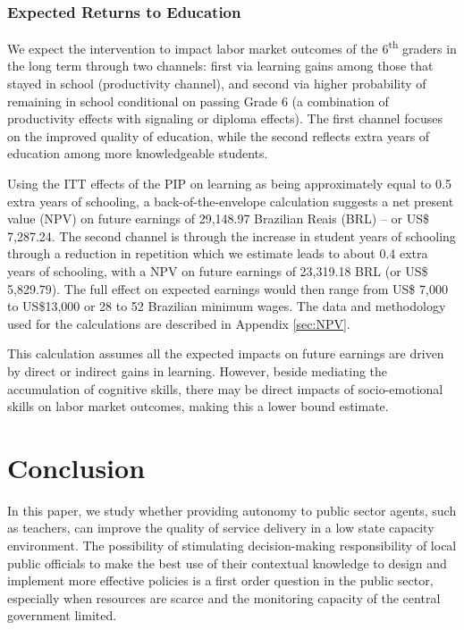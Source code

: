 \documentclass[11pt,a4paper]{article}
\begin{document}
\subsubsection*{Expected Returns to Education} 

We expect the intervention to impact labor market outcomes of the 6\textsuperscript{th} graders in the long term through two channels: first via learning gains among those that stayed in school (productivity channel), and second via higher probability of remaining in school conditional on passing Grade 6 (a combination of productivity effects with signaling or diploma effects). The first channel focuses on the improved quality of education, while the second reflects extra years of education among more knowledgeable students.

Using the ITT effects of the PIP on learning as being approximately equal to 0.5 extra years of schooling, a back-of-the-envelope calculation suggests a net present value (NPV) on future earnings of 29,148.97 Brazilian Reais (BRL) -- or US\$ 7,287.24. The second channel is through the increase in student years of schooling through a reduction in repetition which we estimate leads to about 0.4 extra years of schooling, with a NPV on future earnings of 23,319.18 BRL (or US\$ 5,829.79). The full effect on expected earnings would then range from US\$ 7,000 to US\$13,000 or 28 to 52 Brazilian minimum wages. The data and methodology used for the calculations are described in Appendix \ref{sec:NPV}. 

This calculation assumes all the expected impacts on future earnings are driven by direct or indirect gains in learning. However, beside mediating the accumulation of cognitive skills, there may be direct impacts of socio-emotional skills on labor market outcomes, making this a lower bound estimate. 


\section{Conclusion} \label{sec:conclude}

In this paper, we study whether providing autonomy to public sector agents, such as teachers, can improve the quality of service delivery in a low state capacity environment. The possibility of stimulating decision-making responsibility of local public officials to make the best use of their contextual knowledge to design and implement more effective policies is a first order question in the public sector, especially when resources are scarce and the monitoring capacity of the central government limited.
\end{document}
